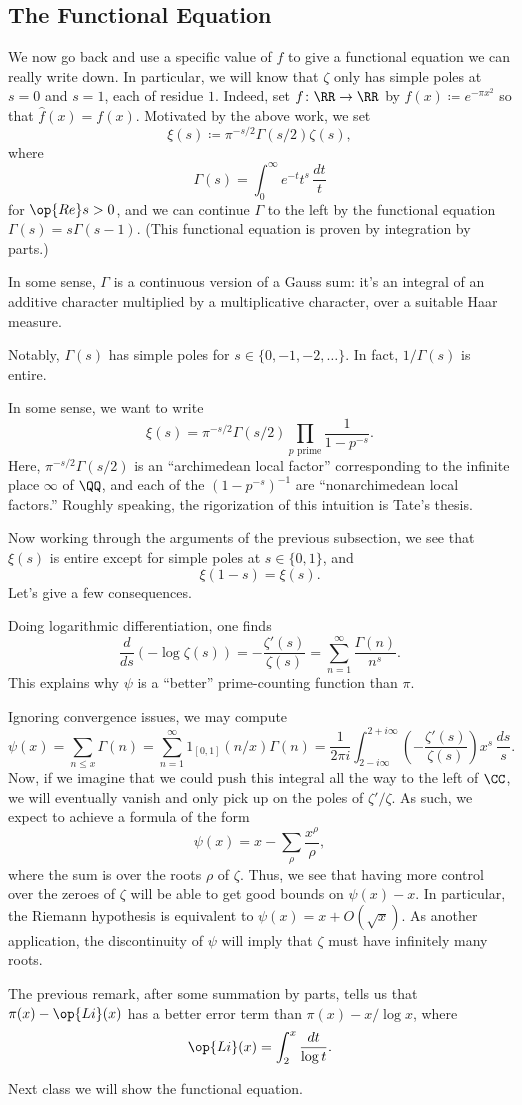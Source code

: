 \documentclass[../notes.tex]{subfiles}
\begin{document}
\subsection{The Functional Equation}
We now go back and use a specific value of $f$ to give a functional equation we can really write down. In particular, we will know that $\zeta$ only has simple poles at $s=0$ and $s=1$, each of residue $1$. Indeed, set $f\colon\RR\to\RR$ by $f(x)\coloneqq e^{-\pi x^2}$ so that $\widehat f(x)=f(x)$. Motivated by the above work, we set
\[\xi(s)\coloneqq\pi^{-s/2}\Gamma(s/2)\zeta(s),\]
where
\[\Gamma(s)=\int_0^\infty e^{-t}t^s\,\frac{dt}t\]
for $\op{Re}s>0$, and we can continue $\Gamma$ to the left by the functional equation $\Gamma(s)=s\Gamma(s-1)$. (This functional equation is proven by integration by parts.)
\begin{remark}
	In some sense, $\Gamma$ is a continuous version of a Gauss sum: it's an integral of an additive character multiplied by a multiplicative character, over a suitable Haar measure.
\end{remark}
\begin{remark}
	Notably, $\Gamma(s)$ has simple poles for $s\in\{0,-1,-2,\ldots\}$. In fact, $1/\Gamma(s)$ is entire.
\end{remark}
\begin{remark}
	In some sense, we want to write
	\[\xi(s)=\pi^{-s/2}\Gamma(s/2)\prod_{p\text{ prime}}\frac1{1-p^{-s}}.\]
	Here, $\pi^{-s/2}\Gamma(s/2)$ is an ``archimedean local factor'' corresponding to the infinite place $\infty$ of $\QQ$, and each of the $\left(1-p^{-s}\right)^{-1}$ are ``nonarchimedean local factors.'' Roughly speaking, the rigorization of this intuition is Tate's thesis.
\end{remark}
Now working through the arguments of the previous subsection, we see that $\xi(s)$ is entire except for simple poles at $s\in\{0,1\}$, and
\[\xi(1-s)=\xi(s).\]
Let's give a few consequences.
\begin{remark}
	Doing logarithmic differentiation, one finds
	\[\frac d{ds}(-\log\zeta(s))=-\frac{\zeta'(s)}{\zeta(s)}=\sum_{n=1}^\infty\frac{\Gamma(n)}{n^s}.\]
	This explains why $\psi$ is a ``better'' prime-counting function than $\pi$.
\end{remark}
\begin{remark}
	Ignoring convergence issues, we may compute
	\[\psi(x)=\sum_{n\le x}\Gamma(n)=\sum_{n=1}^\infty1_{[0,1]}(n/x)\Gamma(n)=\frac1{2\pi i}\int_{2-i\infty}^{2+i\infty}\left(-\frac{\zeta'(s)}{\zeta(s)}\right)x^s\,\frac{ds}s.\]
	Now, if we imagine that we could push this integral all the way to the left of $\CC$, we will eventually vanish and only pick up on the poles of $\zeta'/\zeta$. As such, we expect to achieve a formula of the form
	\[\psi(x)=x-\sum_\rho\frac{x^\rho}\rho,\]
	where the sum is over the roots $\rho$ of $\zeta$. Thus, we see that having more control over the zeroes of $\zeta$ will be able to get good bounds on $\psi(x)-x$. In particular, the Riemann hypothesis is equivalent to $\psi(x)=x+O(\sqrt x)$. As another application, the discontinuity of $\psi$ will imply that $\zeta$ must have infinitely many roots.
\end{remark}
\begin{remark}
	The previous remark, after some summation by parts, tells us that $\pi(x)-\op{Li}(x)$ has a better error term than $\pi(x)-x/\log x$, where
	\[\op{Li}(x)=\int_2^x\frac{dt}{\log t}.\]
\end{remark}
Next class we will show the functional equation.
\end{document}
